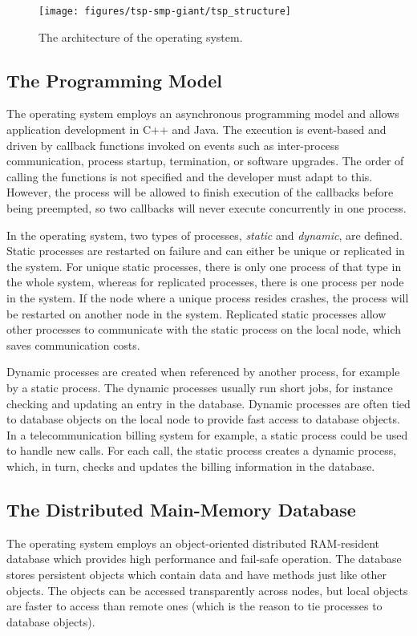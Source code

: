 \begin{figure*}[thb]
  \centering
  \texttt{[image: figures/tsp-smp-giant/tsp\_structure]}
  \caption{The architecture of the operating system.}
  \label{fig:tsp_structure}
\end{figure*}

\subsection{The Programming Model}
The operating system employs an asynchronous programming model and allows
application development in C++ and Java. The execution is event-based and
driven by callback functions invoked on events such as inter-process
communication, process startup, termination, or software upgrades. The order
of calling the functions is not specified and the developer must adapt to
this.  However, the process will be allowed to finish execution of the
callbacks before being preempted, so two callbacks will never execute
concurrently in one process.


In the operating system, two types of processes, \emph{static} and
\emph{dynamic}, are defined. Static processes are restarted on failure and can
either be unique or replicated in the system. For unique static processes,
there is only one process of that type in the whole system, whereas for
replicated processes, there is one process per node in the system.  If the
node where a unique process resides crashes, the process will be restarted on
another node in the system.  Replicated static processes allow other processes
to communicate with the static process on the local node, which saves
communication costs.

Dynamic processes are created when referenced by another process, for example
by a static process. The dynamic processes usually run short jobs, for
instance checking and updating an entry in the database. Dynamic processes are
often tied to database objects on the local node to provide fast access to
database objects. In a telecommunication billing system for example, a static
process could be used to handle new calls. For each call, the static process
creates a dynamic process, which, in turn, checks and updates the billing
information in the database.

\subsection{The Distributed Main-Memory Database}
The operating system employs an object-oriented distributed RAM-resident
database which provides high performance and fail-safe operation. The database
stores persistent objects which contain data and have methods just like other
objects. The objects can be accessed transparently across nodes, but local
objects are faster to access than remote ones (which is the reason to tie
processes to database objects).

